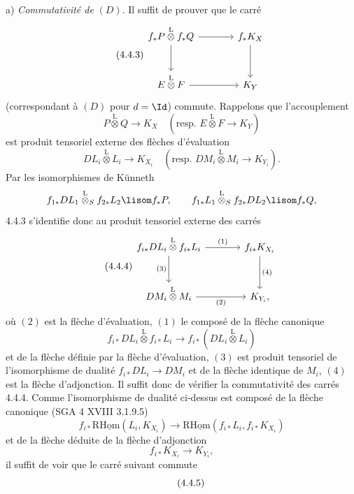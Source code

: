 \begin{prooftext}[Démonstration -]
a) \emph{Commutativité de} $(D)$. Il suffit de prouver que le carré
\begin{equation}
\tag{4.4.3}
\begin{tikzcd}[column sep=large,row sep=large]
f_*P\overset{\mathrm{L}}{\otimes}f_*Q \arrow[r] \arrow[d] & f_*K_X \arrow[d]\\
E\overset{\mathrm{L}}{\otimes}F \arrow[r] & K_Y
\end{tikzcd}
\end{equation}
(correspondant à $(D)$ pour $d=\Id$) commute. Rappelons que l'accouplement
\[
P\overset{\mathrm{L}}{\otimes}Q\longrightarrow K_X
\quad(\text{resp. }E\overset{\mathrm{L}}{\otimes}F\longrightarrow K_Y)
\]
est produit tensoriel externe des flèches d'évaluation
\[
DL_i\overset{\mathrm{L}}{\otimes}L_i\longrightarrow K_{X_i}
\quad(\text{resp. }DM_i\overset{\mathrm{L}}{\otimes}M_i\longrightarrow K_{Y_i}).
\]
Par les isomorphismes de Künneth
\[
f_{1*}DL_1\overset{\mathrm{L}}{\otimes}_S f_{2*}L_2 \lisom f_*P,\qquad
f_{1*}L_1\overset{\mathrm{L}}{\otimes}_S f_{2*}DL_2 \lisom f_*Q,
\]
4.4.3 s'identifie donc au produit tensoriel externe des carrés
\begin{equation}
\tag{4.4.4}
\begin{tikzcd}[column sep=large,row sep=large]
f_{i*}DL_i\overset{\mathrm{L}}{\otimes} f_{i*}L_i
 \arrow[r,"(1)"] \arrow[d,"(3)"'] &
f_{i*}K_{X_i} \arrow[d,"(4)"]\\
DM_i\overset{\mathrm{L}}{\otimes}M_i \arrow[r,"(2)"'] & K_{Y_i},
\end{tikzcd}
\end{equation}
où $(2)$ est la flèche d'évaluation, $(1)$ le composé de la flèche canonique
\[
f_{i*}DL_i\overset{\mathrm{L}}{\otimes} f_{i*}L_i\longrightarrow f_{i*}(DL_i\overset{\mathrm{L}}{\otimes}L_i)
\]
et de la flèche
définie par la flèche d'évaluation, $(3)$ est produit tensoriel de l'isomorphisme de dualité $f_{i*}DL_i\longrightarrow DM_i$ et de la flèche identique de $M_i$, $(4)$ est la flèche d'adjonction. Il suffit donc de vérifier la commutativité des carrés 4.4.4. Comme l'isomorphisme de dualité ci-dessus est composé de la flèche canonique (SGA 4 XVIII 3.1.9.5)
\[
f_{i*}\mathrm{R}\underline{\mathrm{Hom}}(L_i,K_{X_i})\longrightarrow \mathrm{R}\underline{\mathrm{Hom}}(f_{i*}L_i,f_{i*}K_{X_i})
\]
et de la flèche déduite de la flèche d'adjonction
\[
f_{i*}K_{X_i}\longrightarrow K_{Y_i},
\]
il suffit de voir que le carré suivant commute
\begin{equation}
\tag{4.4.5}
\begin{tikzcd}[column sep=large,row sep=large]

\end{tikzcd}
\end{equation}
\end{prooftext}
